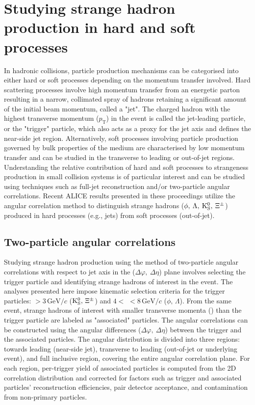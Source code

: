 \section{Studying strange hadron production in hard and soft processes}

In hadronic collisions, particle production mechanisms can be categorised into either hard or soft processes depending on the momentum transfer 
involved. Hard scattering processes involve high momentum transfer from an energetic parton resulting in a narrow, collimated spray of hadrons 
retaining a significant amount of the initial beam momentum, called a "jet". The charged hadron with the highest transverse momentum 
($p_{\mathrm{T}}$) in the event is called the jet-leading particle, or the "trigger" particle, which also acts as a proxy for the 
jet axis and defines the near-side jet region. Alternatively, soft processes involving particle production governed by bulk properties of the medium are 
characterised by low momentum transfer and can be studied in the transverse to leading or out-of-jet regions. Understanding the relative contribution of hard and soft 
processes to strangeness production in small collision systems is of particular interest and can be studied using techniques such as full-jet 
reconstruction and/or two-particle angular correlations. Recent ALICE results presented in these proceedings utilize the angular correlation method 
to distinguish strange hadrons ($\phi,\:\Lambda,\:\mathrm{K_S^0},\:\Xi^{\pm}$) produced in hard processes (e.g., jets) from soft processes (out-of-jet).

\subsection{Two-particle angular correlations}
Studying strange hadron production using the method of two-particle angular correlations \cite{Correlations:2013} with respect to jet axis in the 
($\Delta\varphi,\:\Delta\eta$) plane involves selecting the trigger particle and identifying strange hadrons of interest in the event. The analyses 
presented here impose kinematic selection criteria for the trigger particles: \pt$ > 3\, \mathrm{GeV}/c$ ($\mathrm{K_S^0},\,\Xi^{\pm}$) and 
$4 < $ \pt $< 8\, \mathrm{GeV}/c$ ($\phi,\,\Lambda$). From the same event, strange hadrons of interest with smaller transverse momenta (\pt) than the 
trigger particle are labeled as "associated" particles. The angular correlations can be constructed using the angular differences ($\Delta\varphi,\:\Delta\eta$) between the trigger 
and the associated particles. The angular distribution is divided into three regions: towards leading (near-side jet), 
transverse to leading (out-of-jet or underlying event), and full inclusive region, covering the entire angular correlation plane. For each region, 
per-trigger yield of associated particles is computed from the 2D correlation distribution and corrected for factors such as trigger and associated 
particles' reconstruction efficiencies, pair detector acceptance, and contamination from non-primary particles.